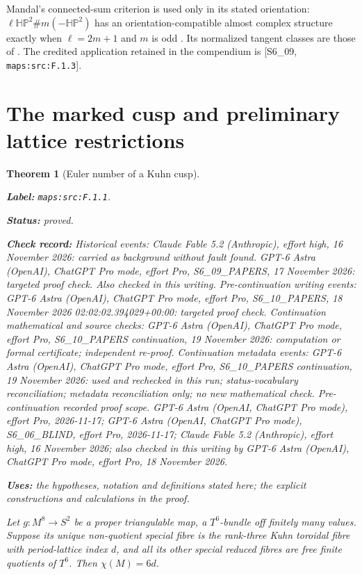 \documentclass[11pt,a4paper]{article}
\newtheorem{theorem}{Theorem}[section]
\theoremstyle{definition}
\newcommand{\StatementRecord}[4]{\par\smallskip\begingroup\upshape\raggedright\noindent\textbf{Label:} \nolinkurl{#1}.\par\noindent\textbf{Status:} #2.\par\noindent\textbf{Check record:} #3.\par\noindent\textbf{Uses:} #4.\par\endgroup\smallskip}
\begin{document}
Mandal's connected-sum criterion is used only in its stated
orientation: $\ell\mathbb{HP}^2\#m(-\mathbb{HP}^2)$ has an
orientation-compatible almost complex structure exactly when
$\ell=2m+1$ and $m$ is odd
\cite[Corollary 1.4, p.~4, and its proof in \S5]{ffMandal}.
Its normalized tangent classes are those of
\cite[Lemma 2.1, p.~5, and Theorem 2.4, p.~7]{ffMandal}.
The credited application retained in the compendium is
[S6\_09, \nolinkurl{maps:src:F.1.3}].


\section{The marked cusp and preliminary lattice restrictions}



\begin{theorem}[Euler number of a Kuhn cusp]\label{maps:src:F.1.1}
\StatementRecord{maps:src:F.1.1}{proved}{Historical events: Claude Fable 5.2 (Anthropic), effort high, 16 November 2026: carried as background without fault found. GPT-6 Astra (OpenAI), ChatGPT Pro mode, effort Pro, S6\_09\_PAPERS, 17 November 2026: targeted proof check. Also checked in this writing. Pre-continuation writing events: GPT-6 Astra (OpenAI), ChatGPT Pro mode, effort Pro, S6\_10\_PAPERS, 18 November 2026 02:02:02.394029+00:00: targeted proof check. Continuation mathematical and source checks: GPT-6 Astra (OpenAI), ChatGPT Pro mode, effort Pro, S6\_10\_PAPERS continuation, 19 November 2026: computation or formal certificate; independent re-proof. Continuation metadata events: GPT-6 Astra (OpenAI), ChatGPT Pro mode, effort Pro, S6\_10\_PAPERS continuation, 19 November 2026: used and rechecked in this run; status-vocabulary reconciliation; metadata reconciliation only; no new mathematical check. \emph{Pre-continuation recorded proof scope.} GPT-6 Astra (OpenAI, ChatGPT Pro mode), effort Pro, 2026-11-17; GPT-6 Astra (OpenAI, ChatGPT Pro mode), S6\_06\_BLIND, effort Pro, 2026-11-17; Claude Fable 5.2 (Anthropic), effort high, 16 November 2026; also checked in this writing by GPT-6 Astra (OpenAI), ChatGPT Pro mode, effort Pro, 18 November 2026}{the hypotheses, notation and definitions stated here; the explicit constructions and calculations in the proof}


Let $g:M^8\to S^2$ be a proper triangulable map, a $T^6$-bundle
off finitely many values.  Suppose its unique non-quotient special
fibre is the rank-three Kuhn toroidal fibre with period-lattice
index $d$, and all its other special reduced fibres are free
finite quotients of $T^6$.  Then $\chi(M)=6d$.

\end{theorem}
\end{document}
